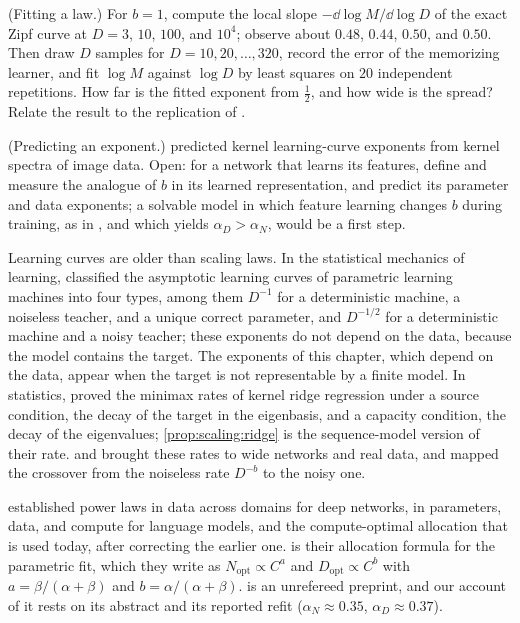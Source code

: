 \begin{refsection}
\begin{exercises}
\item \simulation (Fitting a law.) For $b=1$, compute the local slope $-\dd\log M/\dd\log D$ of the exact Zipf curve at $D=3$, $10$, $100$, and $10^4$; observe about $0.48$, $0.44$, $0.50$, and $0.50$. Then draw $D$ samples for $D=10,20,\dots,320$, record the error of the memorizing learner, and fit $\log M$ against $\log D$ by least squares on $20$ independent repetitions. How far is the fitted exponent from $\frac12$, and how wide is the spread? Relate the result to the replication of \textcite{BesirogluEtAl2024}.\label{ex:scaling:fit}

\item \research (Predicting an exponent.) \Textcite{SpiglerEtAl2020} predicted kernel learning-curve exponents from kernel spectra of image data. Open: for a network that learns its features, define and measure the analogue of $b$ in its learned representation, and predict its parameter and data exponents; a solvable model in which feature learning changes $b$ during training, as in \textcite{BordelonEtAl2025}, and which yields $\alpha_D>\alpha_N$, would be a first step.\label{ex:scaling:research}
\end{exercises}

\notesandrefs
Learning curves are older than scaling laws. In the statistical mechanics of learning, \textcite{AmariEtAl1992} classified the asymptotic learning curves of parametric learning machines into four types, among them $D^{-1}$ for a deterministic machine, a noiseless teacher, and a unique correct parameter, and $D^{-1/2}$ for a deterministic machine and a noisy teacher; these exponents do not depend on the data, because the model contains the target. The exponents of this chapter, which depend on the data, appear when the target is not representable by a finite model. In statistics, \textcite{CaponnettoDeVito2007} proved the minimax rates of kernel ridge regression under a source condition, the decay of the target in the eigenbasis, and a capacity condition, the decay of the eigenvalues; \cref{prop:scaling:ridge} is the sequence-model version of their rate. \Textcite{BordelonEtAl2020} and \textcite{SpiglerEtAl2020} brought these rates to wide networks and real data, and \textcite{CuiEtAl2021} mapped the crossover from the noiseless rate $D^{-b}$ to the noisy one.

\Textcite{HestnessEtAl2017} established power laws in data across domains for deep networks, \textcite{KaplanEtAl2020} in parameters, data, and compute for language models, and \textcite{HoffmannEtAl2022} the compute-optimal allocation that is used today, after correcting the earlier one.  is their allocation formula for the parametric fit, which they write as $N_{\mathrm{opt}}\propto C^a$ and $D_{\mathrm{opt}}\propto C^b$ with $a=\beta/(\alpha+\beta)$ and $b=\alpha/(\alpha+\beta)$. \Textcite{BesirogluEtAl2024} is an unrefereed preprint, and our account of it rests on its abstract and its reported refit ($\alpha_N\approx0.35$, $\alpha_D\approx0.37$).


\end{refsection}
